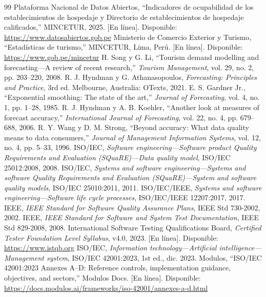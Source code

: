 \documentclass[conference]{IEEEtran}
\begin{document}
\begin{thebibliography}{99}
 Plataforma Nacional de Datos Abiertos, ``Indicadores de ocupabilidad de los establecimientos de hospedaje y Directorio de establecimientos de hospedaje calificados,'' MINCETUR, 2025. [En línea]. Disponible: \url{https://www.datosabiertos.gob.pe}
 Ministerio de Comercio Exterior y Turismo, ``Estadísticas de turismo,'' MINCETUR, Lima, Perú. [En línea]. Disponible: \url{https://www.gob.pe/mincetur}
 H. Song y G. Li, ``Tourism demand modelling and forecasting---A review of recent research,'' \emph{Tourism Management}, vol. 29, no. 2, pp. 203--220, 2008.
 R. J. Hyndman y G. Athanasopoulos, \emph{Forecasting: Principles and Practice}, 3rd ed. Melbourne, Australia: OTexts, 2021.
 E. S. Gardner Jr., ``Exponential smoothing: The state of the art,'' \emph{Journal of Forecasting}, vol. 4, no. 1, pp. 1--28, 1985.
 R. J. Hyndman y A. B. Koehler, ``Another look at measures of forecast accuracy,'' \emph{International Journal of Forecasting}, vol. 22, no. 4, pp. 679--688, 2006.
 R. Y. Wang y D. M. Strong, ``Beyond accuracy: What data quality means to data consumers,'' \emph{Journal of Management Information Systems}, vol. 12, no. 4, pp. 5--33, 1996.
 ISO/IEC, \emph{Software engineering---Software product Quality Requirements and Evaluation (SQuaRE)---Data quality model}, ISO/IEC 25012:2008, 2008.
 ISO/IEC, \emph{Systems and software engineering---Systems and software Quality Requirements and Evaluation (SQuaRE)---System and software quality models}, ISO/IEC 25010:2011, 2011.
 ISO/IEC/IEEE, \emph{Systems and software engineering---Software life cycle processes}, ISO/IEC/IEEE 12207:2017, 2017.
 IEEE, \emph{IEEE Standard for Software Quality Assurance Plans}, IEEE Std 730-2002, 2002.
 IEEE, \emph{IEEE Standard for Software and System Test Documentation}, IEEE Std 829-2008, 2008.
 International Software Testing Qualifications Board, \emph{Certified Tester Foundation Level Syllabus}, v4.0, 2023. [En línea]. Disponible: \url{https://www.istqb.org}
 ISO/IEC, \emph{Information technology---Artificial intelligence---Management system}, ISO/IEC 42001:2023, 1st ed., dic. 2023.
 Modulos, ``ISO/IEC 42001:2023 Annexes A--D: Reference controls, implementation guidance, objectives, and sectors,'' Modulos Docs. [En línea]. Disponible: \url{https://docs.modulos.ai/frameworks/iso-42001/annexes-a-d.html}

\end{thebibliography}
\end{document}
